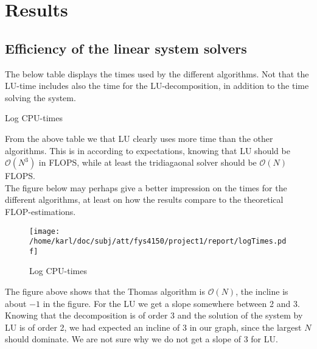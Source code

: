 \documentclass{article}
\begin{document}
\section{Results}

\subsection{Efficiency of the linear system solvers}
The below table displays the times used by the different algorithms. Not that the LU-time includes also the time for the LU-decomposition, in addition to the time solving the system.

\begin{table}[H]
	\begin{minipage}{.32\textwidth} %
		
	\end{minipage}\hfill
	\begin{minipage}{.32\textwidth} %
		
	\end{minipage}\hfill
	\begin{minipage}{.32\textwidth}
		
	\end{minipage}\hfill
	\caption{Log CPU-times}
	\label{table:logtimes}
\end{table}

From the above table we that LU clearly uses more time than the other algorithms. This is in according to expectations, knowing that LU should be $\mathcal{O}(N^3)$ in FLOPS, while at least the tridiagaonal solver should be $\mathcal{O}(N)$ FLOPS.\\

The figure below may perhaps give a better impression on the times for the different algorithms, at least on how the results compare to the theoretical FLOP-estimations.

\begin{figure}[H]
	\centering
	\texttt{[image: /home/karl/doc/subj/att/fys4150/project1/report/logTimes.pdf]}
	\caption{Log CPU-times}
	\label{fig:logtimes}
\end{figure}

The figure above shows that the Thomas algorithm is $\mathcal{O}(N)$, the incline is about $-1$ in the figure. For the LU we get a slope somewhere between 2 and 3. Knowing that the decomposition is of order 3 and the solution of the system by LU is of order 2, we had expected an incline of 3 in our graph, since the largest $N$ should dominate. We are not sure why we do not get a slope of 3 for LU. \\
\end{document}
